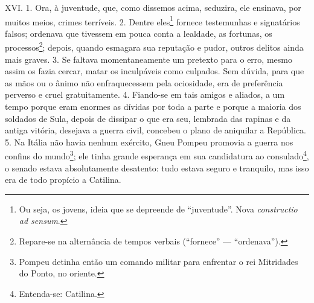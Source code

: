 XVI. 1. Ora, à juventude, que, como dissemos acima, seduzira, ele ensinava, por
muitos meios, crimes terríveis. 2. Dentre eles\footnote{Ou seja, os jovens, ideia que se depreende de ``juventude''. Nova \emph{constructio ad sensum}.} fornece testemunhas e
signatários falsos; ordenava que tivessem em pouca conta a lealdade, as
fortunas, os processos\footnote{Repare-se na alternância de tempos verbais
(``fornece'' --- ``ordenava'').}; depois, quando esmagara sua reputação e
pudor, outros delitos ainda mais graves. 3. Se faltava momentaneamente um
pretexto para o erro, mesmo assim os fazia cercar, matar os inculpáveis como
culpados.  Sem dúvida, para que as mãos ou o ânimo não enfraquecessem pela ociosidade,
era de preferência perverso e cruel gratuitamente. 4. Fiando-se em tais amigos
e aliados, a um tempo porque eram enormes as dívidas por toda a parte e porque
a maioria dos soldados de Sula, depois de dissipar o que era seu, lembrada das
rapinas e da antiga vitória, desejava a guerra civil, concebeu o plano de
aniquilar a República. 5. Na Itália não havia nenhum exército, Gneu Pompeu
promovia a guerra nos confins do mundo\footnote{Pompeu detinha então um comando
militar para enfrentar o rei Mitridades do Ponto, no oriente.};  ele tinha
grande esperança em sua candidatura ao consulado\footnote{Entenda-se:
Catilina.}, o senado estava absolutamente desatento: tudo estava seguro e
tranquilo, mas isso era de todo propício a Catilina.


